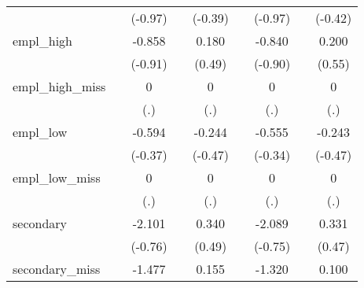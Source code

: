 {\begin{tabular}{l*{8}{c}}
            &                     &     (-0.97)         &                     &     (-0.39)         &                     &     (-0.97)         &                     &     (-0.42)         \\
[1em]
empl\_high   &                     &      -0.858         &                     &       0.180         &                     &      -0.840         &                     &       0.200         \\
            &                     &     (-0.91)         &                     &      (0.49)         &                     &     (-0.90)         &                     &      (0.55)         \\
[1em]
empl\_high\_miss&                     &           0         &                     &           0         &                     &           0         &                     &           0         \\
            &                     &         (.)         &                     &         (.)         &                     &         (.)         &                     &         (.)         \\
[1em]
empl\_low    &                     &      -0.594         &                     &      -0.244         &                     &      -0.555         &                     &      -0.243         \\
            &                     &     (-0.37)         &                     &     (-0.47)         &                     &     (-0.34)         &                     &     (-0.47)         \\
[1em]
empl\_low\_miss&                     &           0         &                     &           0         &                     &           0         &                     &           0         \\
            &                     &         (.)         &                     &         (.)         &                     &         (.)         &                     &         (.)         \\
[1em]
secondary   &                     &      -2.101         &                     &       0.340         &                     &      -2.089         &                     &       0.331         \\
            &                     &     (-0.76)         &                     &      (0.49)         &                     &     (-0.75)         &                     &      (0.47)         \\
[1em]
secondary\_miss&                     &      -1.477         &                     &       0.155         &                     &      -1.320         &                     &       0.100         \\

\end{tabular}}
